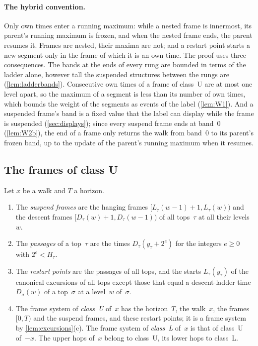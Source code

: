 \paragraph{The hybrid convention.} Only own times enter a running maximum: while a nested frame is innermost, its parent's
running maximum is frozen, and when the nested frame ends, the parent resumes it. Frames are nested, their maxima are not; and a
restart point starts a new segment only in the frame of which it is an own time. The proof uses three consequences. The bands
at the ends of every rung are bounded in terms of the ladder alone, however tall the suspended structures between the rungs are
(\cref{lem:ladderbands}). Consecutive own times of a frame of class~U are at most one level apart, so the maximum of a segment is less than its number of own times, which bounds the weight of the segments as
events of the label (\cref{lem:W1}). And a suspended frame's band is a fixed value that the label can display while the frame is
suspended (\cref{sec:displays}); since every suspend frame ends at band~$0$ (\cref{lem:W2b}), the end of a frame only returns the
walk from band~$0$ to its parent's frozen band, up to the update of the parent's running maximum when it resumes.

\subsection{The frames of class U}\label{sec:ladders-framesU}

\begin{definition}\label{def:framesU}
Let $x$ be a walk and $T$ a horizon.
\begin{enumerate}[label=(\alph*)]
\item The \emph{suspend frames} are the hanging frames $[L_\tau(w-1)+1,L_\tau(w))$ and the descent frames
$[D_\tau(w)+1,D_\tau(w-1))$ of all tops~$\tau$ at all their levels~$w$.
\item The \emph{passages} of a top~$\tau$ are the times $D_\tau(y_\tau+2^e)$ for the integers $e\ge0$ with $2^e<H_\tau$.
\item The \emph{restart points} are the passages of all tops, and the starts $L_\tau(y_\tau)$ of the canonical excursions of
all tops except those that equal a descent-ladder time $D_\sigma(w)$ of a top~$\sigma$ at a level~$w$ of~$\sigma$.
\item The frame system of \emph{class~U} of~$x$ has the horizon~$T$, the walk~$x$, the frames $[0,T)$ and the suspend frames,
and these restart points; it is a frame system by \cref{lem:excursions}(c). The frame system of \emph{class~L} of~$x$ is that
of class~U of~$-x$. The upper hops of~$x$ belong to class~U, its lower hops to class~L.
\end{enumerate}
\end{definition}

